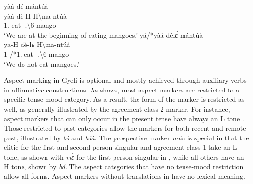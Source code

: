 \documentclass[output=paper,colorlinks=true, citecolor=brown,draftmode]{langscibook}
\begin{document}
\begin{exe} 
\ex\label{INCH}
\begin{xlist}
\ex\label{INCHa} 
  \glll     yàá  dé mántúà \\
          yàá dè-H {H\backslash{}ma-ntúà}\\
              1{\PL}.{\INCH} eat-{\R} {{\OBJ}.{\LINK}\backslash{}6-mango}\\
    \trans `We are at the beginning of eating mangoes.'
\ex\label{INCHb}
  \glll     yá/*yàá délɛ́ mántúà \\
            ya-H dè-lɛ {H\backslash{}ma-ntúà}\\
              1{\PL}-{\PRS}/*1{\PL}.{\INCH} eat-{\NEG} {{\OBJ}.{\LINK}\backslash{}6-mango}\\
    \trans `We do not eat mangoes.'
\end{xlist}
\end{exe}

Aspect marking in Gyeli is optional and mostly achieved through auxiliary verbs in affirmative constructions. As  shows, most aspect markers are restricted to a specific tense-mood category. As a result, the form of the {\STAMP} marker is restricted as well, as generally illustrated by the agreement class 2 {\STAMP} marker. For instance, aspect markers that can only occur in the present tense have always an L tone {\STAMP}. Those restricted to past categories allow the {\STAMP} markers for both recent and remote past, illustrated by  {\itshape bà} and {\itshape báà}. The prospective marker {\itshape múà} is special in that the {\STAMP} clitic for the first and second person singular and agreement class 1 take an L tone, as shown with {\itshape mɛ̀} for the first person singular in , while all others have an H tone, shown by {\itshape bá}. The aspect categories that have no tense-mood restriction allow all {\STAMP} forms. Aspect markers without translations in  have no lexical meaning. 
\end{document}
